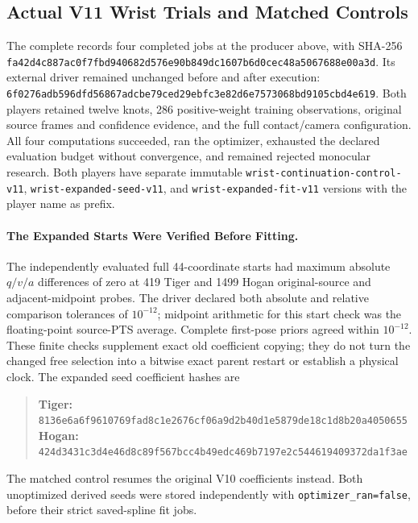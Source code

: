 \documentclass[11pt,letterpaper]{article}
\newcommand{\code}[1]{\nolinkurl{#1}}
\newcommand{\hash}[1]{{\footnotesize\nolinkurl{#1}}}
\begin{document}
\subsection{Actual V11 Wrist Trials and Matched Controls}
\label{sec:wrist-v11-results}
The complete  records four
completed jobs at the producer above, with SHA-256
\hash{fa42d4c887ac0f7fbd940682d576e90b849dc1607b6d0cec48a5067688e00a3d}.
Its external driver remained unchanged before and after execution:
\hash{6f0276adb596dfd56867adcbe79ced29ebfc3e82d6e7573068bd9105cbd4e619}.
Both players retained twelve knots, 286 positive-weight training observations,
original source frames and confidence evidence, and the full contact/camera
configuration. All four computations succeeded, ran the optimizer, exhausted
the declared evaluation budget without convergence, and remained rejected
monocular research. Both players have separate immutable
\code{wrist-continuation-control-v11}, \code{wrist-expanded-seed-v11}, and
\code{wrist-expanded-fit-v11} versions with the player name as prefix.

\paragraph{The Expanded Starts Were Verified Before Fitting.}
The independently evaluated full 44-coordinate starts had maximum absolute
$q/v/a$ differences of zero at 419 Tiger and 1499 Hogan original-source and
adjacent-midpoint probes. The driver declared both absolute and relative
comparison tolerances of $10^{-12}$; midpoint arithmetic for this start check
was the floating-point source-PTS average. Complete first-pose priors agreed
within $10^{-12}$. These finite checks supplement exact old coefficient copying;
they do not turn the changed free selection into a bitwise exact parent
restart or establish a physical clock. The expanded seed coefficient hashes are
\begin{quote}\small
\textbf{Tiger:}
\hash{8136e6a6f9610769fad8c1e2676cf06a9d2b40d1e5879de18c1d8b20a4050655}\\
\textbf{Hogan:}
\hash{424d3431c3d4e46d8c89f567bcc4b49edc469b7197e2c544619409372da1f3ae}
\end{quote}
The matched control resumes the original V10 coefficients instead. Both
unoptimized derived seeds were stored independently with
\code{optimizer_ran=false}, before their strict saved-spline fit jobs.
\end{document}
